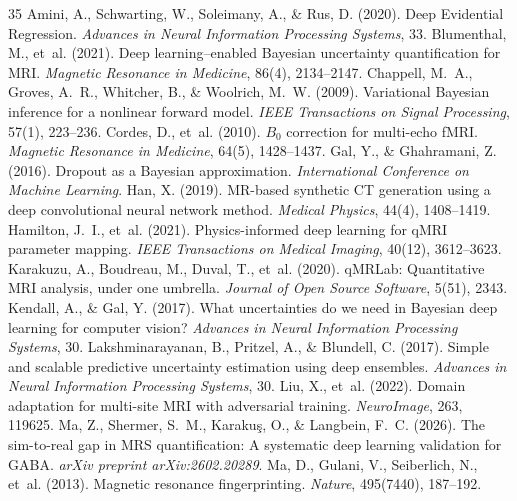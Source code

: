\documentclass[11pt,a4paper]{article}
\begin{document}
\begin{thebibliography}{35}
 Amini, A., Schwarting, W., Soleimany, A., \& Rus, D. (2020). Deep Evidential Regression. \emph{Advances in Neural Information Processing Systems}, 33.
 Blumenthal, M., et~al. (2021). Deep learning--enabled Bayesian uncertainty quantification for MRI. \emph{Magnetic Resonance in Medicine}, 86(4), 2134--2147.
 Chappell, M.~A., Groves, A.~R., Whitcher, B., \& Woolrich, M.~W. (2009). Variational Bayesian inference for a nonlinear forward model. \emph{IEEE Transactions on Signal Processing}, 57(1), 223--236.
 Cordes, D., et~al. (2010). $B_0$ correction for multi-echo fMRI. \emph{Magnetic Resonance in Medicine}, 64(5), 1428--1437.
 Gal, Y., \& Ghahramani, Z. (2016). Dropout as a Bayesian approximation. \emph{International Conference on Machine Learning}.
 Han, X. (2019). MR-based synthetic CT generation using a deep convolutional neural network method. \emph{Medical Physics}, 44(4), 1408--1419.
 Hamilton, J.~I., et~al. (2021). Physics-informed deep learning for qMRI parameter mapping. \emph{IEEE Transactions on Medical Imaging}, 40(12), 3612--3623.
 Karakuzu, A., Boudreau, M., Duval, T., et~al. (2020). qMRLab: Quantitative MRI analysis, under one umbrella. \emph{Journal of Open Source Software}, 5(51), 2343.
 Kendall, A., \& Gal, Y. (2017). What uncertainties do we need in Bayesian deep learning for computer vision? \emph{Advances in Neural Information Processing Systems}, 30.
 Lakshminarayanan, B., Pritzel, A., \& Blundell, C. (2017). Simple and scalable predictive uncertainty estimation using deep ensembles. \emph{Advances in Neural Information Processing Systems}, 30.
 Liu, X., et~al. (2022). Domain adaptation for multi-site MRI with adversarial training. \emph{NeuroImage}, 263, 119625.
 Ma, Z., Shermer, S.~M., Karaku\c{s}, O., \& Langbein, F.~C. (2026). The sim-to-real gap in MRS quantification: A systematic deep learning validation for GABA. \emph{arXiv preprint arXiv:2602.20289}.
 Ma, D., Gulani, V., Seiberlich, N., et~al. (2013). Magnetic resonance fingerprinting. \emph{Nature}, 495(7440), 187--192.

\end{thebibliography}
\end{document}
